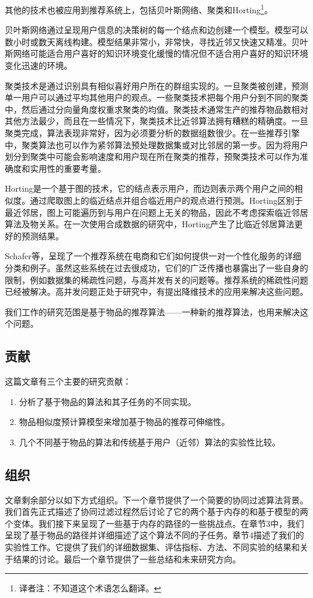\documentclass{../upctrans}
\begin{document}
其他的技术也被应用到推荐系统上，包括贝叶斯网络、聚类和Horting\footnote{译者注：不知道这个术语怎么翻译。}。

贝叶斯网络通过呈现用户信息的决策树的每一个结点和边创建一个模型。模型可以数小时或数天离线构建。模型结果非常小，非常快，寻找近邻又快速又精准。贝叶斯网络可能适合用户喜好的知识环境变化缓慢的情况但不适合用户喜好的知识环境变化迅速的环境。

聚类技术是通过识别具有相似喜好用户所在的群组实现的。一旦聚类被创建，预测单一用户可以通过平均其他用户的观点。一些聚类技术把每个用户分到不同的聚类中，然后通过分向量角度权重求聚类的均值。聚类技术通常生产的推荐物品数相对其他方法最少，而且在一些情况下，聚类技术比近邻算法拥有糟糕的精确度。一旦聚类完成，算法表现非常好，因为必须要分析的数据组数很少。在一些推荐引擎中，聚类算法也可以作为紧邻算法预处理数据集或对比邻居的第一步。因为将用户划分到聚类中可能会影响速度和用户现在所在聚类的推荐，预聚类技术可以作为准确度和实用性的重要考量。

Horting是一个基于图的技术，它的结点表示用户，而边则表示两个用户之间的相似度。通过爬取图上的临近结点并组合临近用户的观点进行预测。Horting区别于最近邻居，图上可能遍历到与用户在问题上无关的物品，因此不考虑探索临近邻居算法及物关系。在一次使用合成数据的研究中，Horting产生了比临近邻居算法更好的预测结果。

Schafer等，呈现了一个推荐系统在电商和它们如何提供一对一个性化服务的详细分类和例子。虽然这些系统在过去很成功，它们的广泛传播也暴露出了一些自身的限制，例如数据集的稀疏性问题，与高并发有关的问题等。推荐系统的稀疏性问题已经被解决。高并发问题正处于研究中，有提出降维技术的应用来解决这些问题。

我们工作的研究范围是基于物品的推荐算法——一种新的推荐算法，也用来解决这个问题。

\subsection{贡献}

这篇文章有三个主要的研究贡献：

\begin{enumerate}
    \item 分析了基于物品的算法和其子任务的不同实现。
    \item 物品相似度预计算模型来增加基于物品的推荐可伸缩性。
    \item 几个不同基于物品的算法和传统基于用户（近邻）算法的实验性比较。
\end{enumerate}

\subsection{组织}

文章剩余部分以如下方式组织。下一个章节提供了一个简要的协同过滤算法背景。我们首先正式描述了协同过滤过程然后讨论了它的两个基于内存的和基于模型的两个变体。我们接下来呈现了一些基于内存的路径的一些挑战点。在章节3中，我们呈现了基于物品的路径并详细描述了这个算法不同的子任务。章节4描述了我们的实验性工作。它提供了我们的详细数据集、评估指标、方法、不同实验的结果和关于结果的讨论。最后一个章节提供了一些总结和未来研究方向。
\end{document}
